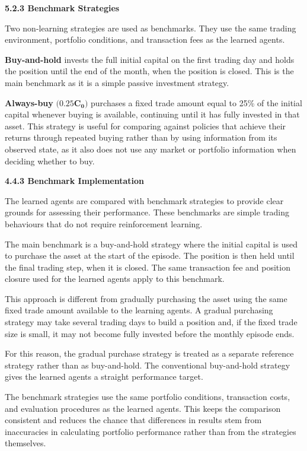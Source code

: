 \textbf{5.2.3 Benchmark Strategies}

Two non-learning strategies are used as benchmarks. They use the same
trading environment, portfolio conditions, and transaction fees as the
learned agents.

\textbf{Buy-and-hold} invests the full initial capital on the first
trading day and holds the position until the end of the month, when the
position is closed. This is the main benchmark as it is a simple passive
investment strategy.

\textbf{Always-buy} \(\mathbf{(0.25}\mathbf{C}_{\mathbf{0}}\mathbf{)}\)
purchases a fixed trade amount equal to 25\% of the initial capital
whenever buying is available, continuing until it has fully invested in
that asset. This strategy is useful for comparing against policies that
achieve their returns through repeated buying rather than by using
information from its observed state, as it also does not use any market
or portfolio information when deciding whether to buy.

\textbf{4.4.3 Benchmark Implementation}

The learned agents are compared with benchmark strategies to provide
clear grounds for assessing their performance. These benchmarks are
simple trading behaviours that do not require reinforcement learning.

The main benchmark is a buy-and-hold strategy where the initial capital
is used to purchase the asset at the start of the episode. The position
is then held until the final trading step, when it is closed. The same
transaction fee and position closure used for the learned agents apply
to this benchmark.

This approach is different from gradually purchasing the asset using the
same fixed trade amount available to the learning agents. A gradual
purchasing strategy may take several trading days to build a position
and, if the fixed trade size is small, it may not become fully invested
before the monthly episode ends.

For this reason, the gradual purchase strategy is treated as a separate
reference strategy rather than as buy-and-hold. The conventional
buy-and-hold strategy gives the learned agents a straight performance
target.

The benchmark strategies use the same portfolio conditions, transaction
costs, and evaluation procedures as the learned agents. This keeps the
comparison consistent and reduces the chance that differences in results
stem from inaccuracies in calculating portfolio performance rather than
from the strategies themselves.

